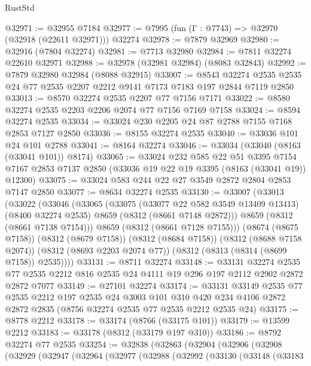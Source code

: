 \begin{lexlean}{RustStd}
\begin{coremodule}
@32971 := @32955 @7184
@32977 := @7995 (fun (Γ : @7743) => @32970 (@32918 (@22611 @32971))) @32274
@32978 := @7879 @32969
@32980 := @32916 (@7804 @32274)
@32981 := @7713 @32980
@32984 := @7811 @32274 @22610 @32971
@32988 := @32978 (@32981 @32984) (@8083 @32843)
@32992 := @7879 @32980 @32984 (@8088 @32915)
@33007 := @8543
    @32274
    @2535
    @2535
    @24
    @77
    @2535
    @2207
    @2212
    @9141
    @7173
    @7183
    @197
    @2844
    @7119
    @2850
@33013 := @8570 @32274 @2535 @2207 @77 @7156 @7171
@33022 := @8580 @32274 @2535 @2203 @2206 @2074 @77 @7156 @7169 @7158
@33024 := @8594 @32274 @2535
@33034 := @33024 @230 @2205 @24 @87 @2788 @7155 @7168 @2853 @7127 @2850
@33036 := @8155 @32274 @2535
@33040 := @33036 @101 @24 @101 @2788
@33041 := @8164 @32274
@33046 := @33034 (@33040 (@8163 (@33041 @101)) @8174)
@33065 := @33024
    @232
    @585
    @22
    @51
    @3395
    @7154
    @7167
    @2853
    @7137
    @2850
    (@33036 @19 @22 @19 @3395 (@8163 (@33041 @19)) @12300)
@33075 := @33024 @583 @244 @22 @27 @3549 @2872 @2804 @2853 @7147 @2850
@33077 := @8634 @32274 @2535
@33130 := @33007
    (@33013
      (@33022
        (@33046
          (@33065
            (@33075
              (@33077 @22 @582 @3549 @13409 @13413)
              (@8400 @32274 @2535)
              @8659
              (@8312 (@8661 @7148 @2872)))
            @8659
            (@8312 (@8661 @7138 @7154)))
          @8659
          (@8312 (@8661 @7128 @7155)))
        (@8674 (@8675 @7158))
        (@8312 (@8679 @7158))
        (@8312 (@8684 @7158))
        (@8312 (@8688 @7158 @2074))
        (@8312 (@8693 @2203 @2074 @77))
        (@8312 (@8313 (@8314 (@8699 @7158)) @2535))))
@33131 := @8711 @32274
@33148 := @33131
    @32274
    @2535
    @77
    @2535
    @2212
    @816
    @2535
    @24
    @4111
    @19
    @296
    @197
    @2112
    @2902
    @2872
    @2872
    @7077
@33149 := @27101 @32274
@33174 := @33131
    @33149
    @2535
    @77
    @2535
    @2212
    @197
    @2535
    @24
    @3003
    @101
    @310
    @420
    @234
    @4106
    @2872
    @2872
    @2835
    (@8756 @32274 @2535 @77 @2535 @2212 @2535 @24)
@33175 := @8778 @2212
@33178 := @33174 (@8766 (@33175 @101))
@33179 := @13599 @2212
@33183 := @33178 (@8312 (@33179 @197 @310))
@33186 := @8792 @32274 @77 @2535
@33254 := @32838
    (@32863
      (@32904
        (@32906
          (@32908
            (@32929
              (@32947
                (@32964
                  (@32977
                    (@32988
                      (@32992
                        (@33130
                          (@33148
                            (@33183

\end{coremodule}
\end{lexlean}
